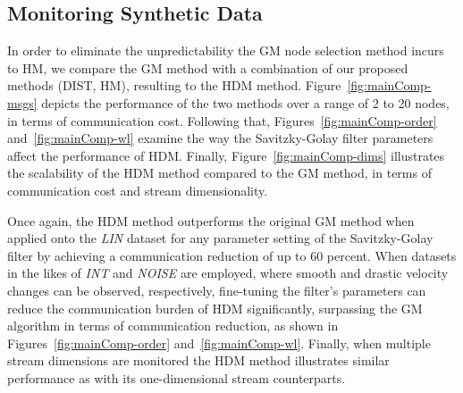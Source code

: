 \subsection{Monitoring Synthetic Data} \label{subsec:mainComp}

In order to eliminate the unpredictability the GM node selection method incurs to HM, we compare the GM method with a combination of our proposed methods (DIST, HM), resulting to the HDM method. Figure~\ref{fig:mainComp-msgs} depicts the performance of the two methods over a range of 2 to 20 nodes, in terms of communication cost. Following that, Figures~\ref{fig:mainComp-order} and~\ref{fig:mainComp-wl} examine the way the Savitzky-Golay filter parameters affect the performance of HDM. Finally, Figure~\ref{fig:mainComp-dims} illustrates the scalability of the HDM method compared to the GM method, in terms of communication cost and stream dimensionality.

Once again, the HDM method outperforms the original GM method when applied onto the \emph{LIN} dataset for any parameter setting of the Savitzky-Golay filter by achieving a communication reduction of up to 60 percent. When datasets in the likes of \emph{INT} and \emph{NOISE} are employed, where smooth and drastic velocity changes can be observed, respectively, fine-tuning the filter's parameters can reduce the communication burden of HDM significantly, surpassing the GM algorithm in terms of communication reduction, as shown in Figures~\ref{fig:mainComp-order} and~\ref{fig:mainComp-wl}. Finally, when multiple stream dimensions are monitored the HDM method illustrates similar performance as with its one-dimensional stream counterparts.


